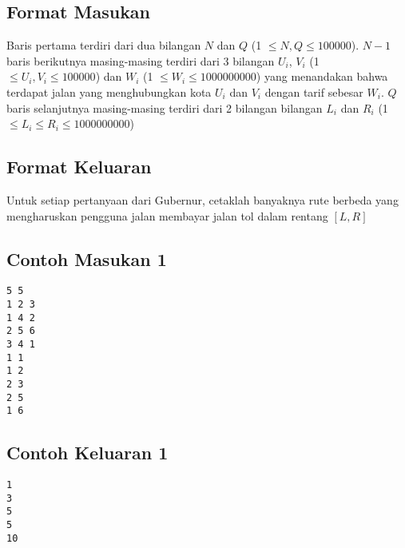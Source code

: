 \documentclass{article}
\begin{document}


\subsection*{Format Masukan}


Baris pertama terdiri dari dua bilangan $N$ dan $Q$ (1 $\leq N, Q \leq 100000$).
${N-1}$ baris berikutnya masing-masing terdiri dari 3 bilangan $U_i$, $V_i$ (1 $\leq U_i, V_i \leq 100000$) dan $W_i$ (1 $\leq W_i \leq 1000000000$) yang menandakan bahwa terdapat jalan yang 
menghubungkan kota $U_i$ dan $V_i$ dengan tarif sebesar $W_i$.
$Q$ baris selanjutnya masing-masing terdiri dari 2 bilangan bilangan $L_i$ dan $R_i$ (1 $\leq L_i \leq R_i \leq 1000000000$)

\subsection*{Format Keluaran}
Untuk setiap pertanyaan dari Gubernur, cetaklah banyaknya rute berbeda yang mengharuskan pengguna jalan membayar jalan tol dalam rentang $[L,R]$ 
\begin{multicols}{2}
\subsection*{Contoh Masukan 1}
\begin{lstlisting}
5 5
1 2 3
1 4 2
2 5 6
3 4 1
1 1
1 2
2 3
2 5
1 6
\end{lstlisting}
\vfill
\null
\columnbreak
\subsection*{Contoh Keluaran 1}
\begin{lstlisting}
1
3
5
5
10
\end{lstlisting}
\end{multicols}



\pagebreak
\end{document}
